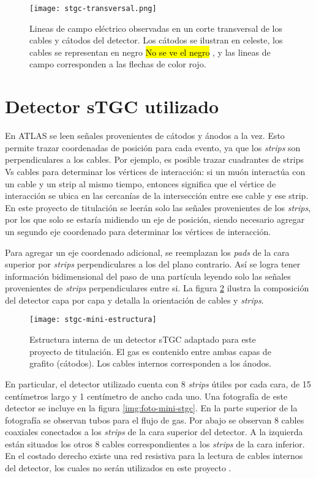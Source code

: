 	\begin{figure}[h]
		\centering
		\texttt{[image: stgc-transversal.png]}
		\caption{Lineas de campo eléctrico observadas en un corte transversal de los cables y cátodos del detector. Los cátodos se ilustran en celeste, los cables se representan en negro \hl{No se ve el negro} , y las lineas de campo corresponden a las flechas de color rojo\cite{DeSmet2011StudyLab}.}
		\label{img:stgc-field}
	\end{figure}

\section{Detector sTGC utilizado}
	En ATLAS se leen señales provenientes de cátodos y ánodos a la vez. Esto permite trazar coordenadas de posición para cada evento, ya que los \textit{strips} son perpendiculares a los cables. Por ejemplo, es posible trazar cuadrantes de strips Vs cables  para determinar los vértices de interacción: si un muón interactúa con un cable y un strip al mismo tiempo, entonces significa que el vértice de interacción se ubica en las cercanías de la intersección entre ese cable y ese strip. En este proyecto de titulación se leerán solo las señales provenientes de los \textit{strips}, por los que solo se estaría midiendo un eje de posición, siendo necesario agregar un segundo eje coordenado para determinar los vértices de interacción.
	
	Para agregar un eje coordenado adicional, se reemplazan los \textit{pads} de la cara superior por \textit{strips} perpendiculares a los del plano contrario. Así se logra tener información bidimensional del paso de una partícula leyendo solo las señales provenientes de \textit{strips} perpendiculares entre si. La figura \ref{img:stgc-mini-estructura} ilustra la composición del detector capa por capa y detalla la orientación de cables y \textit{strips}.
	
	\begin{figure}[h]
		\centering
		\texttt{[image: stgc-mini-estructura]}
		\caption{Estructura interna de un detector sTGC adaptado para este proyecto de titulación. El gas es contenido entre ambas capas de grafito (cátodos). Los cables internos corresponden a los ánodos.}
		\label{img:stgc-mini-estructura}
	\end{figure}

	En particular, el detector utilizado cuenta con 8 \textit{strips} útiles  por cada cara, de 15 centímetros largo y 1 centímetro de ancho cada uno. Una fotografía de este detector se incluye en la figura \ref{img:foto-mini-stgc}. En la parte superior de la fotografía se observan tubos para el flujo de gas. Por abajo se observan 8 cables coaxiales conectados a los \textit{strips} de la cara superior del detector. A la izquierda están situados los otros 8 cables correspondientes a los \textit{strips} de la cara inferior. En el costado derecho existe una red resistiva para la lectura de cables internos del detector, los cuales no serán utilizados en este proyecto .
	
